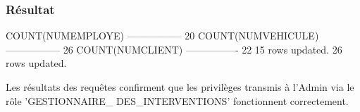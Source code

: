 \documentclass[•]{article}
\begin{document}
\subsubsection{Résultat}
\begin{sql}
COUNT(NUMEMPLOYE)
-----------------
			   20
COUNT(NUMVEHICULE)
-----------------
				26
COUNT(NUMCLIENT)
----------------
			  22
15 rows updated.
26 rows updated.
			  
\end{sql}

\textrm{Les résultats des requêtes confirment que les privilèges transmis à l'Admin via le rôle 'GESTIONNAIRE\_ DES\_INTERVENTIONS' fonctionnent correctement.}
\end{document}
